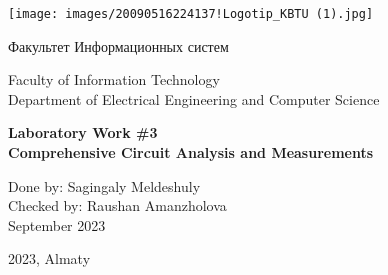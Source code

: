 \documentclass{article}
\begin{document}
\begin{titlepage}
    \centering
    \texttt{[image: images/20090516224137!Logotip\_KBTU (1).jpg]}
    
    \vspace{0cm} %
    {\fontsize{40}{48}\selectfont Факультет Информационных систем} %
    
    \vspace{0.1cm} %
    
    \begin{center} %
        Faculty of Information Technology\\
        Department of Electrical Engineering and Computer Science
    \end{center}
    
    \vfill %
    
    {\LARGE\bfseries Laboratory Work \#3}\\
    {\LARGE\bfseries Comprehensive Circuit Analysis and Measurements}
    
    \vspace{4cm} %
    
    \begin{flushright}
        Done by: Sagingaly Meldeshuly \\
        Checked by: Raushan Amanzholova \\
        September 2023
    \end{flushright}
    
    \vfill %
    \begin{center}
        2023, Almaty
    \end{center}
    
\end{titlepage}
\end{document}

